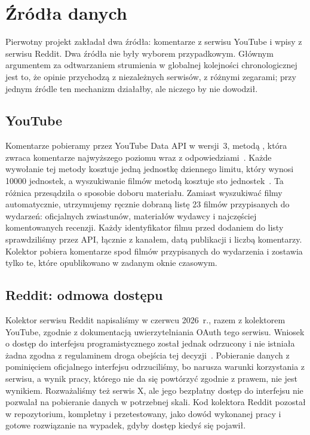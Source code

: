 \section{Źródła danych}
\label{sec:req-sources}

Pierwotny projekt zakładał dwa źródła: komentarze z serwisu YouTube i wpisy z serwisu Reddit.
Dwa źródła nie były wyborem przypadkowym.
Głównym argumentem za odtwarzaniem strumienia w globalnej kolejności chronologicznej jest to, że opinie przychodzą z niezależnych serwisów, z różnymi zegarami; przy jednym źródle ten mechanizm działałby, ale niczego by nie dowodził.

\subsection{YouTube}
\label{sec:req-youtube}

Komentarze pobieramy przez YouTube Data API w wersji~3, metodą , która zwraca komentarze najwyższego poziomu wraz z odpowiedziami~\cite{docyoutubecommentthreads}.
Każde wywołanie tej metody kosztuje jedną jednostkę dziennego limitu, który wynosi \num{10000} jednostek, a wyszukiwanie filmów metodą  kosztuje sto jednostek~\cite{docyoutubequota}.
Ta różnica przesądziła o sposobie doboru materiału.
Zamiast wyszukiwać filmy automatycznie, utrzymujemy ręcznie dobraną listę 23 filmów przypisanych do wydarzeń: oficjalnych zwiastunów, materiałów wydawcy i najczęściej komentowanych recenzji.
Każdy identyfikator filmu przed dodaniem do listy sprawdziliśmy przez API, łącznie z kanałem, datą publikacji i liczbą komentarzy.
Kolektor pobiera komentarze spod filmów przypisanych do wydarzenia i zostawia tylko te, które opublikowano w zadanym oknie czasowym.

\subsection{Reddit: odmowa dostępu}
\label{sec:req-reddit}

Kolektor serwisu Reddit napisaliśmy w czerwcu 2026~r., razem z kolektorem YouTube, zgodnie z dokumentacją uwierzytelniania OAuth tego serwisu.
Wniosek o dostęp do interfejsu programistycznego został jednak odrzucony i nie istniała żadna zgodna z regulaminem droga obejścia tej decyzji~\cite{redditdataapi}.
Pobieranie danych z pominięciem oficjalnego interfejsu odrzuciliśmy, bo narusza warunki korzystania z serwisu, a wynik pracy, którego nie da się powtórzyć zgodnie z prawem, nie jest wynikiem.
Rozważaliśmy też serwis X, ale jego bezpłatny dostęp do interfejsu nie pozwalał na pobieranie danych w potrzebnej skali.
Kod kolektora Reddit pozostał w repozytorium, kompletny i przetestowany, jako dowód wykonanej pracy i gotowe rozwiązanie na wypadek, gdyby dostęp kiedyś się pojawił.

